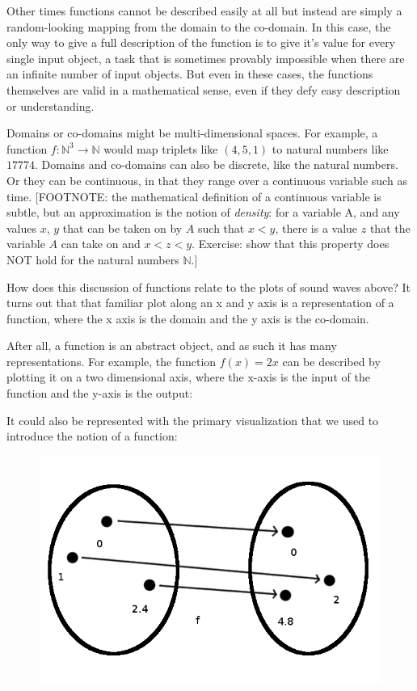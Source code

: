 \documentclass[UTF8]{book}
\begin{document}
\begin{CJK}{UTF8}{gbsn}
Other times functions cannot be described easily at all but instead are simply a random-looking mapping from the domain to the co-domain. In this case, the only way to give a full description of the function is to give it's value for every single input object, a task that is sometimes provably impossible when there are an infinite number of input objects. But even in these cases, the functions themselves are valid in a mathematical sense, even if they defy easy description or understanding.

Domains or co-domains might be multi-dimensional spaces. For example, a function $f: \mathbb{N}^{3} \rightarrow \mathbb{N}$ would map triplets like $(4,5,1)$ to natural numbers like $17774$. Domains and co-domains can also be discrete, like the natural numbers. Or they can be continuous, in that they range over a continuous variable such as time. [FOOTNOTE: the mathematical definition of a continuous variable is subtle, but an approximation is the notion of \emph{density}: for a variable A, and any values $x$, $y$ that can be taken on by $A$ such that $x < y$, there is a value $z$ that the variable $A$ can take on and $x < z < y$. Exercise: show that this property does NOT hold for the natural numbers $\mathbb{N}$.]

How does this discussion of functions relate to the plots of sound waves above? It turns out that that familiar plot along an x and y axis is a representation of a function, where the x axis is the domain and the y axis is the co-domain.

After all, a function is an abstract object, and as such it has many representations. For example, the function $f(x)=2x$ can be described by plotting it on a two dimensional axis, where the x-axis is the input of the function and the y-axis is the output:


It could also be represented with the primary visualization that we used to introduce the notion of a function:

\begin{figure}[H]
\centering
\includegraphics[width=0.8\linewidth]{function_2x}
\end{figure}


\end{CJK}
\end{document}
